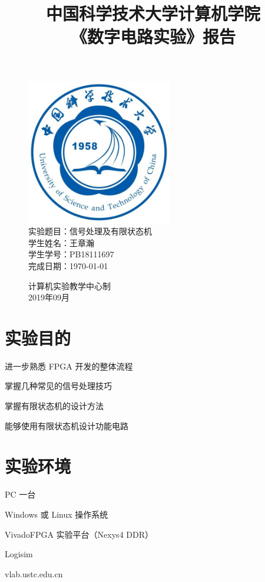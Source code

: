 \documentclass[UTF8]{article}
\title{中国科学技术大学计算机学院\\《数字电路实验》报告}
\author{}
\date{}
\begin{document}
	\maketitle
	\begin{figure}[H]
		\centering
		\includegraphics[width=2.5in]{xiaohui.jpg}\vspace{0.5cm}\\
		\large{
			实验题目：信号处理及有限状态机\\
			学生姓名：王章瀚\\
			学生学号：PB18111697\\
			完成日期：\today\\
		}\vspace{2cm}
		
		\large{计算机实验教学中心制\\2019年09月\\}
		\thispagestyle{empty}
		\clearpage  %
	\end{figure}


	\section{实验目的}
	进一步熟悉 FPGA 开发的整体流程\par
	掌握几种常见的信号处理技巧\par
	掌握有限状态机的设计方法\par
	能够使用有限状态机设计功能电路\par
	
	\section{实验环境}
	PC 一台\par
	Windows 或 Linux 操作系统\par
	VivadoFPGA 实验平台（Nexys4 DDR）\par
	Logisim\par
	vlab.ustc.edu.cn\par
	
\end{document}
